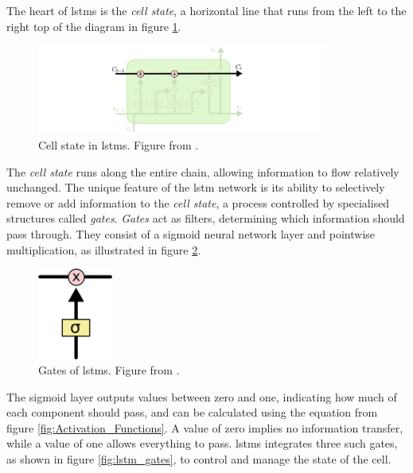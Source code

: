 \noindent
The heart of \glspl{lstm} is the \textit{cell state}, a horizontal line that runs from the left to the right top of the diagram in figure \ref{fig:cell_state_lstm}.

\begin{figure}[ht]
    \centering
    \includegraphics[width=0.85\textwidth]{./assets/img/cell_state_lstm.png}
    \caption{Cell state in \glspl{lstm}. Figure from \cite{Olah_2015}.}
    \label{fig:cell_state_lstm}
\end{figure}

\noindent
The \textit{cell state} runs along the entire chain, allowing information to flow relatively unchanged. The unique feature of the \gls{lstm} network is its ability to selectively remove or add information to the \textit{cell state}, a process controlled by specialised structures called \textit{gates}. \textit{Gates} act as filters, determining which information should pass through. They consist of a sigmoid neural network layer and pointwise multiplication, as illustrated in figure \ref{fig:gates_of_lstms}.

\begin{figure}[ht]
    \centering
    \includegraphics[keepaspectratio,height=3cm]{./assets/img/gates_of_lstms.png}
    \caption{Gates of \glspl{lstm}. Figure from \cite{Olah_2015}.}
    \label{fig:gates_of_lstms}
\end{figure}

\noindent
The sigmoid layer outputs values between zero and one, indicating how much of each component should pass, and can be calculated using the equation from figure \ref{fig:Activation_Functions}. A value of zero implies no information transfer, while a value of one allows everything to pass. \glspl{lstm} integrates three such gates, as shown in figure \ref{fig:lstm_gates}, to control and manage the state of the cell.

